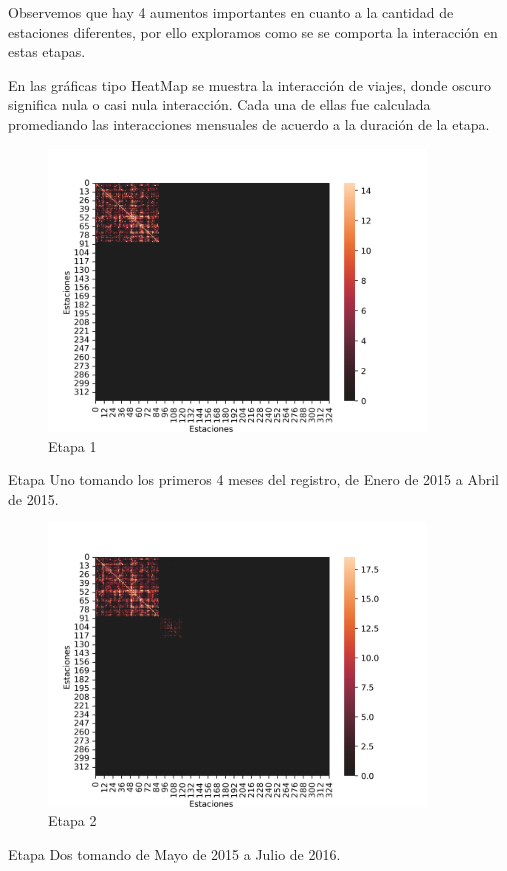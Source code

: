 \documentclass[
]{article}
\begin{document}
Observemos que hay 4 aumentos importantes en cuanto a la cantidad de
estaciones diferentes, por ello exploramos como se se comporta la
interacción en estas etapas.

En las gráficas tipo HeatMap se muestra la interacción de viajes, donde
oscuro significa nula o casi nula interacción. Cada una de ellas fue
calculada promediando las interacciones mensuales de acuerdo a la
duración de la etapa.

\begin{figure}
\centering
\includegraphics[width=10cm]{../plots/resultsUno.png}
\caption{Etapa 1}
\end{figure}

Etapa Uno tomando los primeros 4 meses del registro, de Enero de 2015 a
Abril de 2015.

\begin{figure}[h]
\centering
\includegraphics[width=10cm]{../plots/resultsDos.png}
\caption{Etapa 2}
\end{figure}

Etapa Dos tomando de Mayo de 2015 a Julio de 2016.
\end{document}
